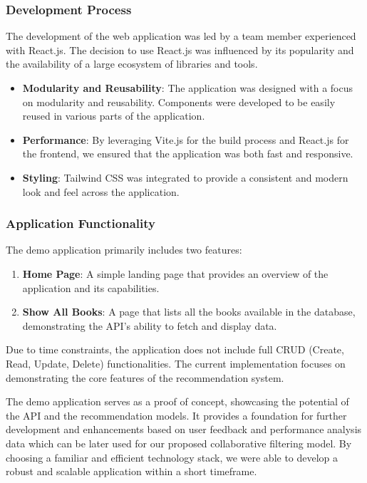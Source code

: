 \subsubsection*{Development Process}

The development of the web application was led by a team member experienced with React.js. The decision to use React.js was influenced by its popularity and the availability of a large ecosystem of libraries and tools.

\begin{itemize}
    \item \textbf{Modularity and Reusability}: The application was designed with a focus on modularity and reusability. Components were developed to be easily reused in various parts of the application.
    \item \textbf{Performance}: By leveraging Vite.js for the build process and React.js for the frontend, we ensured that the application was both fast and responsive.
    \item \textbf{Styling}: Tailwind CSS was integrated to provide a consistent and modern look and feel across the application.
\end{itemize}

\subsubsection*{Application Functionality}

The demo application primarily includes two features:
\begin{enumerate}
    \item \textbf{Home Page}: A simple landing page that provides an overview of the application and its capabilities.
    \item \textbf{Show All Books}: A page that lists all the books available in the database, demonstrating the API's ability to fetch and display data.
\end{enumerate}

Due to time constraints, the application does not include full CRUD (Create, Read, Update, Delete) functionalities. The current implementation focuses on demonstrating the core features of the recommendation system.

The demo application serves as a proof of concept, showcasing the potential of the API and the recommendation models. It provides a foundation for further development and enhancements based on user feedback and performance analysis data which can be later used for our proposed collaborative filtering model. By choosing a familiar and efficient technology stack, we were able to develop a robust and scalable application within a short timeframe.
